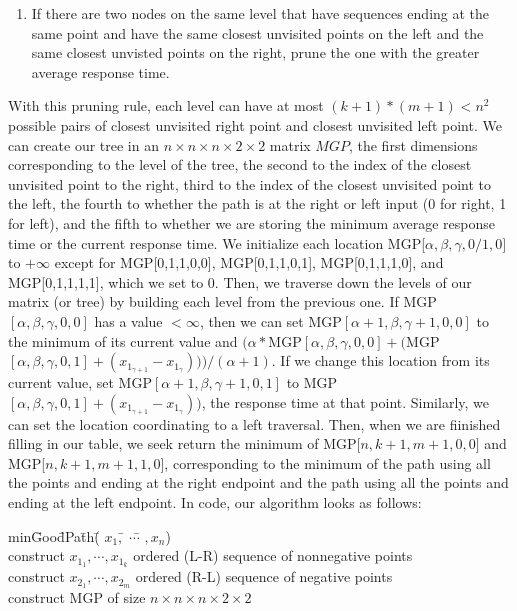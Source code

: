 \documentclass{article}
\begin{document}
\begin{enumerate}
\begin{enumerate}
\item If there are two nodes on the same level that have sequences ending at the same point and have the same closest unvisited points on the left and the same closest unvisted points on the right, prune the one with the greater average response time.
\end{enumerate}
With this pruning rule, each level can have at most $(k+1)*(m+1)<n^2$ possible pairs of closest unvisited right point and closest unvisited left point. We can create our tree in an $n\times n\times n\times 2\times 2$ matrix $MGP$, the first dimensions corresponding to the level of the tree, the second to the index of the closest unvisited point to the right, third to the index of the closest unvisited point to the left, the fourth to whether the path is at the right or left input (0 for right, 1 for left), and the fifth to whether we are storing the minimum average response time or the current response time. We initialize each location MGP[$\alpha ,\beta ,\gamma , 0/1,0]$ to $+\infty$ except for MGP[0,1,1,0,0], MGP[0,1,1,0,1], MGP[0,1,1,1,0], and MGP[0,1,1,1,1], which we set to 0. Then, we traverse down the levels of our matrix (or tree) by building each level from the previous one. If MGP$[\alpha ,\beta ,\gamma ,0,0]$ has a value $<\infty $, then we can set MGP$[\alpha +1,\beta ,\gamma +1,0,0]$ to the minimum of its current value and $(\alpha *$MGP$[\alpha ,\beta ,\gamma ,0,0]+($MGP$[\alpha ,\beta ,\gamma ,0,1] +(x_{1_{\gamma +1}}-x_{1_{\gamma }})))/(\alpha +1)$. If we change this location from its current value, set MGP$[\alpha +1,\beta ,\gamma +1,0,1]$ to MGP$[\alpha ,\beta ,\gamma ,0,1] +(x_{1_{\gamma +1}}-x_{1_{\gamma }}))$, the response time at that point. Similarly, we can set the location coordinating to a left traversal. Then, when we are fiinished filling in our table, we seek return the minimum of MGP[$n,k+1,m+1,0,0]$ and MGP[$n,k+1,m+1,1,0]$, corresponding to the minimum of the path using all the points and ending at the right endpoint and the path using all the points and ending at the left endpoint. In code, our algorithm looks as follows:
\begin{tabbing}
min\= Goo\= dPa\= th(\= $x_1,$\= $\cdots$\= $ ,x_n$)\\
\>construct $x_{1_1},\cdots ,x_{1_k}$ ordered (L-R) sequence of nonnegative points\\
\>construct $x_{2_1},\cdots ,x_{2_m}$ ordered (R-L) sequence of negative points\\
\>construct MGP of size $n\times n\times n\times 2\times 2$\\

\end{tabbing}
\end{enumerate}
\end{document}
